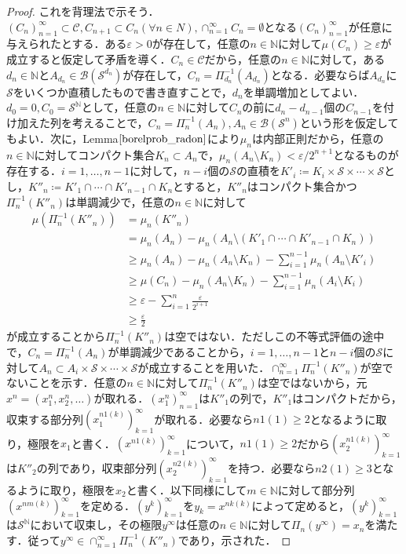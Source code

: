 \documentclass[dvipdfmx,autodetect-engine]{jsarticle}
\theoremstyle{remark}
\theoremstyle{definition}
\begin{document}
\begin{proof}
    これを背理法で示そう．$(C_n)_{n=1}^{\infty} \subset \mathcal{C}, C_{n+1} \subset C_n (\forall n \in N),\cap_{n=1}^{\infty} C_n = \emptyset$となる$(C_n)_{n=1}^{\infty}$が任意に与えられたとする．ある$\varepsilon >0$が存在して，任意の$n \in \mathbb{N}$に対して$\mu (C_n) \geq \varepsilon$が成立すると仮定して矛盾を導く．$C_n \in \mathcal{C}$だから，任意の$n \in \mathbb{N}$に対して，ある$d_n \in \mathbb{N}$と$A_{d_n} \in \mathcal{B}(\mathcal{S}^{d_n})$が存在して，$C_n = \Pi_{d_n}^{-1} (A_{d_n})$となる．必要ならば$A_{d_n}$に$\mathcal{S}$をいくつか直積したもので書き直すことで，$d_n$を単調増加としてよい．$d_0 =0, C_0 = \mathcal{S}^{\mathbb{N}}$として，任意の$n \in \mathbb{N}$に対して$C_n$の前に$d_{n}-d_{n-1}$個の$C_{n-1}$を付け加えた列を考えることで，$C_n = \Pi_n^{-1} (A_n),A_n \in \mathcal{B}(\mathcal{S}^{n})$という形を仮定してもよい．次に，Lemma$\ref{borelprob_radon}$により$\mu_n$は内部正則だから，任意の$n \in \mathbb{N}$に対してコンパクト集合$K_n \subset A_n$で，$\mu_n (A_n \setminus K_n) < \varepsilon / 2^{n+1}$となるものが存在する．$i=1,\ldots,n-1$に対して，$n-i$個の$\mathcal{S}$の直積を$K'_i \coloneqq K_i \times \mathcal{S} \times \cdots \times \mathcal{S}$とし，$K''_n \coloneqq K'_1 \cap  \cdots  \cap K'_{n-1} \cap K_n$とすると，$K''_n$はコンパクト集合かつ$\Pi_n^{-1}(K''_n)$は単調減少で，任意の$n \in \mathbb{N}$に対して
    \begin{align*}
        \mu(\Pi_n^{-1}(K''_n)) &= \mu_n(K''_n)\\
        &= \mu_n(A_n) - \mu_n(A_n \setminus (K'_1 \cap \cdots \cap K'_{n-1} \cap K_n))\\
        &\geq \mu_n(A_n) - \mu_n(A_n \setminus K_n) - \sum_{i=1}^{n-1}\mu_n(A_n\setminus K'_i) \\
        &\geq \mu(C_n) - \mu_n(A_n \setminus K_n) - \sum_{i=1}^{n-1}\mu_n(A_i\setminus K_i) \\
        &\geq \varepsilon - \sum_{i=1}^n \frac{\varepsilon}{2^{i+1}} \\
        &\geq \frac{\varepsilon}{2}
    \end{align*}
    が成立することから$\Pi_n^{-1}(K''_n)$は空ではない．ただしこの不等式評価の途中で，$C_n = \Pi_n^{-1}(A_n)$が単調減少であることから，$i=1,\ldots,n-1$と$n-i$個の$\mathcal{S}$に対して$A_n \subset A_i \times \mathcal{S} \times \cdots \times \mathcal{S}$が成立することを用いた．$\cap_{n=1}^{\infty} \Pi_n^{-1}(K''_n)$が空でないことを示す．任意の$n \in \mathbb{N}$に対して$\Pi_n^{-1}(K''_n)$は空ではないから，元$x^n=(x_1^n,x_2^n,\ldots)$が取れる．$(x_1^n)_{n=1}^{\infty}$は$K''_1$の列で，$K''_1$はコンパクトだから，収束する部分列$(x_1^{n1(k)})_{k=1}^{\infty}$が取れる．必要なら$n1(1)\geq2$となるように取り，極限を$x_{1}$と書く．$(x^{n1(k)})_{k=1}^{\infty}$について，$n1(1)\geq2$だから$(x_2^{n1(k)})_{k=1}^{\infty}$は$K''_2$の列であり，収束部分列$(x_2^{n2(k)})_{k=1}^{\infty}$を持つ．必要なら$n2(1)\geq3$となるように取り，極限を$x_{2}$と書く．以下同様にして$m\in\mathbb{N}$に対して部分列$(x^{nm(k)})_{k=1}^{\infty}$を定める．$(y^k)_{k=1}^{\infty}$を$y_k = x^{nk(k)}$によって定めると，$(y^k)_{k=1}^{\infty}$は$\mathcal{S}^{\mathbb{N}}$において収束し，その極限$y^{\infty}$は任意の$n\in\mathbb{N}$に対して$\Pi_n(y^{\infty})=x_n$を満たす．従って$y^{\infty} \in \cap_{n=1}^{\infty} \Pi_n^{-1}(K''_n)$であり，示された．

\end{proof}
\end{document}

